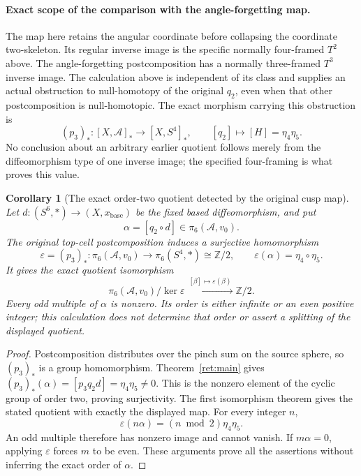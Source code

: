 \documentclass[11pt]{article}
\newtheorem{corollary}[theorem]{Corollary}
\theoremstyle{definition}
\begin{document}
\paragraph{Exact scope of the comparison with the angle-forgetting map.}
The map here retains the angular coordinate before collapsing the
coordinate two-skeleton.  Its regular inverse image is the specific
normally four-framed \(T^2\) above.  The angle-forgetting
postcomposition has a normally three-framed \(T^3\) inverse image.
The calculation above is independent of its class and supplies an
actual obstruction to null-homotopy of the original \(q_2\), even
when that other postcomposition is null-homotopic.  The exact
morphism carrying this obstruction is
\[
 (p_3)_*:[X,\mathcal A]_*\longrightarrow[X,S^4]_*,\qquad
 [q_2]\longmapsto[H]=\eta_4\eta_5.
\]
No conclusion about an arbitrary earlier quotient follows merely
from the diffeomorphism type of one inverse image; the specified
four-framing is what proves this value.

\begin{corollary}[The exact order-two quotient detected by the original cusp map]
\label{ret:q2-detected-quotient}
Let \(d:(S^6,*)\to(X,x_{\mathrm{base}})\) be the fixed based
diffeomorphism, and put
\[
\alpha=[q_2\circ d]\in\pi_6(\mathcal A,v_0).
\]
The original top-cell postcomposition induces a surjective homomorphism
\[
\varepsilon=(p_3)_*:\pi_6(\mathcal A,v_0)
  \longrightarrow\pi_6(S^4,*)\cong\mathbb Z/2,
\qquad \varepsilon(\alpha)=\eta_4\circ\eta_5.
\]
It gives the exact quotient isomorphism
\[
\pi_6(\mathcal A,v_0)/\ker\varepsilon
 \xrightarrow{\ [\beta]\mapsto\varepsilon(\beta)\ }
\mathbb Z/2.
\]
Every odd multiple of \(\alpha\) is nonzero. Its order is either
infinite or an even positive integer; this calculation does not determine
that order or assert a splitting of the displayed quotient.
\end{corollary}
\begin{proof}
Postcomposition distributes over the pinch sum on the source sphere,
so \((p_3)_*\) is a group homomorphism. Theorem~\ref{ret:main}
gives \((p_3)_*(\alpha)=[p_3q_2d]=\eta_4\eta_5\ne0\).
This is the nonzero element of the cyclic group of order two, proving
surjectivity. The first isomorphism theorem gives the stated quotient
with exactly the displayed map. For every integer \(n\),
\[
\varepsilon(n\alpha)=(n\bmod2)\eta_4\eta_5.
\]
An odd multiple therefore has nonzero image and cannot vanish.
If \(m\alpha=0\), applying \(\varepsilon\) forces \(m\)
to be even. These arguments prove all the assertions without inferring
the exact order of \(\alpha\).
\end{proof}
\end{document}
